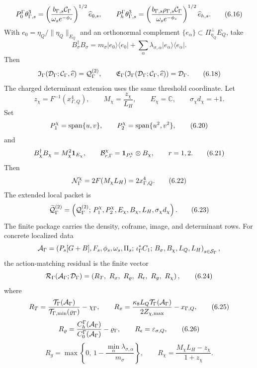 \documentclass[11pt]{article}
\theoremstyle{definition}
\theoremstyle{remark}
\begin{document}
\[
  P_0^\Gamma\theta_{\Gamma,s}^3
  =
  \left(
  \frac{b_{\Gamma,s}{\cal C}_\Gamma}
  {\omega_s e^{-\phi_s}}
  \right)^{1/2}\widehat e_{0,s},
  \qquad
  P_h^\Gamma\theta_{\Gamma,s}^3
  =
  \left(
  \frac{b_{\Gamma,s}\rho_{\Gamma,s}{\cal C}_\Gamma}
  {\omega_s e^{-\phi_s}}
  \right)^{1/2}\widehat e_{h,s}.
  \tag{6.16}
\]
With \(e_0=\eta_Q/\|\eta_Q\|_{E_Q}\) and an orthonormal complement
\(\{e_\alpha\}\subset\Pi_{\eta_Q}^\perp E_Q\), take
\[
  B_\sigma^\dagger B_\sigma
  =
  m_\sigma |e_0\rangle\langle e_0|
  +
  \sum_\alpha
  \lambda_{\sigma,\alpha}
  |e_\alpha\rangle\langle e_\alpha|.
  \tag{6.17}
\]
Then
\[
  {\mathfrak I}_\Gamma({\cal D}_\Gamma;{\cal C}_\Gamma,\widehat e)
  =
  {\cal Q}_\Gamma^{(2)},
  \qquad
  {\mathfrak E}_\Gamma
  \!\left(
  {\mathfrak I}_\Gamma({\cal D}_\Gamma;{\cal C}_\Gamma,\widehat e)
  \right)
  =
  {\cal D}_\Gamma .
  \tag{6.18}
\]
The charged determinant extension uses the same threshold coordinate.  Let
\[
  z_\chi=F^{-1}(x_{\Gamma,Q}^4),
  \qquad
  M_\chi=\frac{z_\chi}{L_H},
  \qquad
  E_\chi=\mathbb C,
  \qquad
  \sigma_\chi d_\chi=+1 .
  \tag{6.19}
\]
Set
\[
  P_1^\chi={\rm span}\{u,v\},
  \qquad
  P_2^\chi={\rm span}\{u^2,v^2\},
  \tag{6.20}
\]
and
\[
  B_\chi^\dagger B_\chi=M_\chi^2{\bf 1}_{E_\chi},
  \qquad
  {\cal B}_{r,\Gamma}^\chi
  =
  {\bf 1}_{P_r^\chi}\otimes B_\chi,
  \qquad r=1,2 .
  \tag{6.21}
\]
Then
\[
  {\cal N}_\Gamma^\chi
  =
  2F(M_\chi L_H)
  =
  2x_{\Gamma,Q}^4 .
  \tag{6.22}
\]
The extended local packet is
\[
  \widetilde{\cal Q}_\Gamma^{(2)}
  =
  \left(
  {\cal Q}_\Gamma^{(2)};\,
  P_1^\chi,P_2^\chi,E_\chi,B_\chi,L_H,\sigma_\chi d_\chi
  \right).
  \tag{6.23}
\]
The finite package carries the density, coframe, image, and determinant rows.
For concrete localized data
\[
  {\cal A}_\Gamma
  =
  \left(
  P_s[G+B],F_s,\phi_s,\omega_s,\Pi_s;\,
  \iota_\Gamma^*C_1;\,
  B_\sigma,B_\chi,L_Q,L_H
  \right)_{s\in{\cal S}_\Gamma},
\]
the action-matching residual is the finite vector
\[
  {\cal R}_\Gamma({\cal A}_\Gamma;{\cal D}_\Gamma)
  =
  \left(
  R_T,\ R_x,\ R_\varrho,\ R_\epsilon,\ R_g,\ R_\chi
  \right),
  \tag{6.24}
\]
where
\[
  R_T
  =
  \frac{{\cal T}_\Gamma({\cal A}_\Gamma)}
  {{\cal T}_{\Gamma,\min}(\varrho_\Gamma)}
  -\chi_\Gamma,
  \qquad
  R_x
  =
  \frac{\kappa_8L_Q{\cal T}_\Gamma({\cal A}_\Gamma)}
  {2Z_{\chi,\max}}
  -x_{\Gamma,Q},
  \tag{6.25}
\]
\[
  R_\varrho
  =
  \frac{C_h^\Gamma({\cal A}_\Gamma)}
  {C_0^\Gamma({\cal A}_\Gamma)}
  -\varrho_\Gamma,
  \qquad
  R_\epsilon=\varepsilon_{\sigma,Q},
  \tag{6.26}
\]
\[
  R_g
  =
  \max\!\left\{0,\,
  1-\frac{\min_\alpha\lambda_{\sigma,\alpha}}{m_\sigma}
  \right\},
  \qquad
  R_\chi
  =
  \frac{M_\chi L_H-z_\chi}{1+z_\chi}.
  \tag{6.27}
\]
\end{document}
